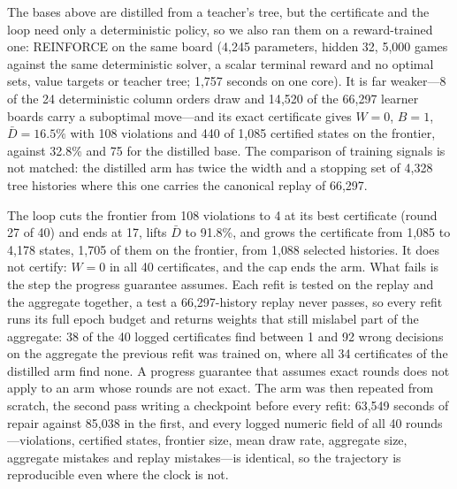 \documentclass[conference]{IEEEtran}
\begin{document}
The bases above are distilled from a teacher's tree, but the certificate and the loop need only a deterministic policy, so we also ran them on a reward-trained one: REINFORCE on the same board (4{,}245 parameters, hidden 32, 5{,}000 games against the same deterministic solver, a scalar terminal reward and no optimal sets, value targets or teacher tree; 1{,}757 seconds on one core). It is far weaker---8 of the 24 deterministic column orders draw and 14{,}520 of the 66{,}297 learner boards carry a suboptimal move---and its exact certificate gives $W=0$, $B=1$, $\bar D=16.5\%$ with 108 violations and 440 of 1{,}085 certified states on the frontier, against 32.8\% and 75 for the distilled base. The comparison of training signals is not matched: the distilled arm has twice the width and a stopping set of 4{,}328 tree histories where this one carries the canonical replay of 66{,}297.

The loop cuts the frontier from 108 violations to 4 at its best certificate (round 27 of 40) and ends at 17, lifts $\bar D$ to 91.8\%, and grows the certificate from 1{,}085 to 4{,}178 states, 1{,}705 of them on the frontier, from 1{,}088 selected histories. It does not certify: $W=0$ in all 40 certificates, and the cap ends the arm. What fails is the step the progress guarantee assumes. Each refit is tested on the replay and the aggregate together, a test a 66{,}297-history replay never passes, so every refit runs its full epoch budget and returns weights that still mislabel part of the aggregate: 38 of the 40 logged certificates find between 1 and 92 wrong decisions on the aggregate the previous refit was trained on, where all 34 certificates of the distilled arm find none. A progress guarantee that assumes exact rounds does not apply to an arm whose rounds are not exact. The arm was then repeated from scratch, the second pass writing a checkpoint before every refit: 63{,}549 seconds of repair against 85{,}038 in the first, and every logged numeric field of all 40 rounds---violations, certified states, frontier size, mean draw rate, aggregate size, aggregate mistakes and replay mistakes---is identical, so the trajectory is reproducible even where the clock is not.
\end{document}
